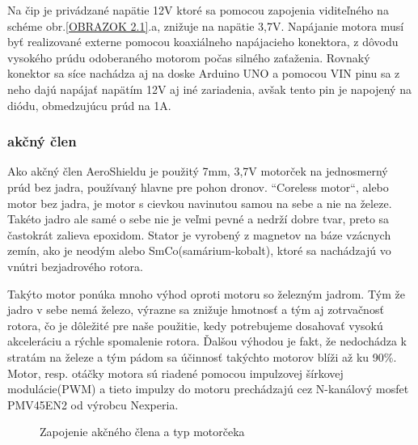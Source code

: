 Na čip je privádzané napätie 12V ktoré sa pomocou zapojenia viditeľného na schéme obr.\ref{OBRAZOK 2.1}.a, znižuje na napätie 3,7V. Napájanie motora musí byť realizované externe pomocou koaxiálneho napájacieho konektora, z dôvodu vysokého prúdu odoberaného motorom počas silného zaťaženia. Rovnaký konektor sa síce nachádza aj na doske Arduino UNO a pomocou VIN pinu sa z neho dajú napájať napätím 12V aj iné zariadenia, avšak tento pin je napojený na diódu, obmedzujúcu prúd na 1A\cite{ampere}\cite{ampere2}.

\subsubsection{akčný člen}
\label{akcclen}

Ako akčný člen AeroShieldu je použitý 7mm, 3,7V motorček na jednosmerný prúd bez jadra, používaný hlavne pre pohon dronov. “Coreless motor“, alebo motor bez jadra, je motor s cievkou navinutou samou na sebe a nie na železe\cite{coreless}. Takéto jadro ale samé o sebe nie je veľmi pevné a nedrží dobre tvar, preto sa častokrát zalieva epoxidom. Stator je vyrobený z magnetov na báze vzácnych zemín, ako je neodým alebo SmCo(samárium-kobalt), ktoré sa nachádzajú vo vnútri bezjadrového rotora.

Takýto motor ponúka mnoho výhod oproti motoru so železným jadrom. Tým že jadro v sebe nemá železo, výrazne sa znižuje hmotnosť a tým aj zotrvačnosť rotora, čo je dôležité pre naše použitie, kedy potrebujeme dosahovať vysokú akceleráciu a rýchle spomalenie rotora. Ďalšou výhodou je fakt, že nedochádza k stratám na železe a tým pádom sa účinnosť takýchto motorov blíži až ku 90\%\cite{5545147}. Motor, resp. otáčky motora sú riadené pomocou impulzovej šírkovej modulácie(PWM) a tieto impulzy do motoru prechádzajú cez N-kanálový mosfet PMV45EN2 od výrobcu Nexperia\cite{pmv}.


\begin{figure}[!tbh]
	\hfill
	\hfill
	\hfill
	\caption{Zapojenie akčného člena a typ motorčeka}\label{OBRAZOK 2.3}
\end{figure}


